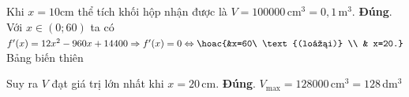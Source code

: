 \begin{ex}
{\begin{itemchoice}
Khi $x=10$cm thể tích khối hộp nhận được là $V=100000\,$cm$^3=0{,}1\,$m$^3$.
\itemch \textbf{Đúng}. Với $x \in(0; 60)$ ta có $f'(x)=12 x^2-960 x+14400 \Rightarrow f'(x)=0 \Leftrightarrow\hoac{&x=60\ \text{(loại)} \\ & x=20.}$\\
Bảng biến thiên
\begin{center}
\end{center}
Suy ra $V$ đạt giá trị lớn nhất khi $x=20\,$cm.
\itemch \textbf{Đúng}. $V_{\max}=128000\,$cm$^3=128\,$dm$^3$
\end{itemchoice}
}
\end{ex}

